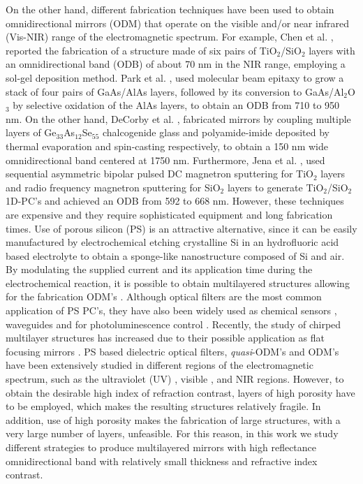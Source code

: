 \documentclass[a4paper,fleqn]{cas-sc}
\begin{document}
On the other hand, different fabrication techniques have been used to
obtain omnidirectional mirrors (ODM) that operate on the visible and/or
near infrared (Vis-NIR) range of the electromagnetic spectrum. For
example, Chen et al. \cite{Chen1999},
reported the fabrication of a structure made of six pairs of
TiO$_{2}$/SiO$_{2}$  layers with
an omnidirectional band (ODB) of about 70 nm in the NIR range, employing a sol-gel deposition
method. Park et al. \cite{Park2003}, used molecular beam epitaxy to
grow a stack of four pairs of GaAs/AlAs layers, followed by its conversion to
GaAs/Al$_{2}$O$_{3}$ by selective oxidation of the AlAs
layers, to obtain an ODB from 710 to 950 nm.
On the other hand, DeCorby et al. \cite{DeCorby2005}, fabricated mirrors by
coupling multiple layers of Ge$_{33}$As$_{12}$Se$_{55}$ chalcogenide glass and
polyamide-imide deposited by thermal evaporation and spin-casting
respectively, to obtain a 150 nm wide omnidirectional band centered at
1750 nm. Furthermore, Jena et al. \cite{Jena2019},
used sequential asymmetric bipolar pulsed DC magnetron sputtering for TiO$%
_{2}$ layers and radio frequency magnetron sputtering for SiO$_{2}$
layers to generate TiO$_{2}$/SiO$_{2}$ 1D-PC's and achieved an ODB from
592 to 668 nm. However, these techniques are expensive and they
require sophisticated equipment and long fabrication times. Use of
porous silicon (PS)
is an attractive alternative, since it can be easily manufactured by
electrochemical etching crystalline Si in an hydrofluoric
acid based electrolyte to obtain a sponge-like nanostructure composed
of Si and air. By modulating the supplied current and its application
time during the electrochemical reaction, it is possible to obtain
multilayered structures allowing for the fabrication ODM's \cite{Xifre2015,Pavesi2000}.
Although optical filters \cite{Estevez2009,Ariza2014} are the most common
application of PS PC's, they have also been widely used as chemical
sensors \cite{Giusseppe2011,Agarwal2018}, waveguides \cite{Hussel1997} and
for photoluminescence control \cite{Antunez2014}. Recently, the study of
chirped multilayer structures has
increased due to their possible application as flat focusing mirrors \cite{Wu2021,Kozar2017,Cheng2018}.
PS based dielectric optical filters, {\em quasi}-ODM's and ODM's have
been extensively studied in different
regions of the electromagnetic spectrum, such as the ultraviolet (UV)
\cite{Jimenez2020}, visible \cite{Ariza2012}, and NIR \cite{Bruyant2003} regions.
However, to obtain the desirable high index of refraction
contrast, layers of high porosity have to be employed, which makes the
resulting structures relatively fragile. In addition, use of high
porosity makes the fabrication of large structures, with a
very large number of layers, unfeasible. For this reason, in this work
we study different strategies to produce multilayered mirrors
with high reflectance omnidirectional band
with relatively small thickness and refractive index contrast.
\end{document}
